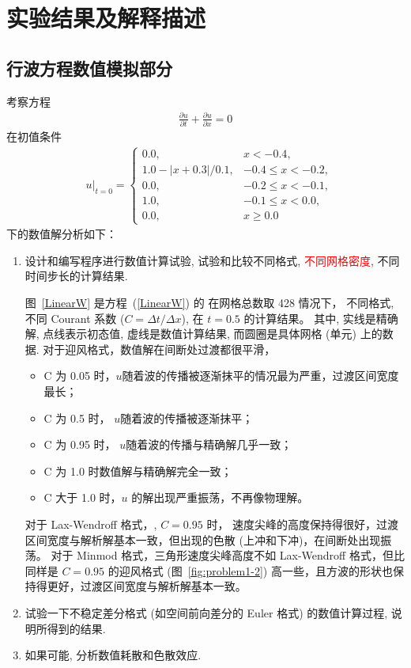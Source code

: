 \documentclass[10.5pt
]{article}
\begin{document}
\section{实验结果及解释描述}
\subsection{行波方程数值模拟部分}
考察方程
\begin{align}
\frac{\partial u}{\partial t} + \frac{\partial u}{\partial x} = 0
\end{align}
在初值条件
\begin{align}
& u|_{t=0} = \left\{\begin{array}{ll} 0.0, & x < -0.4, \\
1.0 - |x + 0.3| / 0.1, & -0.4 \le x < -0.2, \\
0.0, & -0.2 \le x < -0.1, \\
1.0 , & -0.1 \le x < 0.0, \\
0.0, & x \ge 0.0
\end{array}\right.
\end{align}
下的数值解分析如下：

\begin{enumerate}
\item
	设计和编写程序进行数值计算试验, 试验和比较不同格式, \textcolor{red}{不同网格密度}, 不同时间步长的计算结果.

图~\ref{LinearW} 是方程~(\ref{LinearW}) 的
在网格总数取 428 情况下，
不同格式, 不同 Courant 系数 ($C = \Delta t / \Delta x$), 在 $t = 0.5$ 的计算结果。
其中, 实线是精确解, 点线表示初态值, 虚线是数值计算结果, 而圆圈是具体网格 (单元) 上的数据. 
对于迎风格式，数值解在间断处过渡都很平滑，
\begin{itemize}
	\item C 为 0.05 时，$u$随着波的传播被逐渐抹平的情况最为严重，过渡区间宽度最长；
	\item C 为 0.5 时， $u$随着波的传播被逐渐抹平；
	\item C 为 0.95 时， $u$随着波的传播与精确解几乎一致；
	\item C 为 1.0 时数值解与精确解完全一致；
	\item C 大于 1.0 时，$u$ 的解出现严重振荡，不再像物理解。
\end{itemize}
对于 Lax-Wendroff 格式，, $C=0.95$ 时， 速度尖峰的高度保持得很好，过渡区间宽度与解析解基本一致，但出现的色散 (上冲和下冲)，在间断处出现振荡。
对于 Minmod 格式，三角形速度尖峰高度不如 Lax-Wendroff 格式，但比同样是 $C = 0.95$ 的迎风格式 (图~\ref{fig:problem1-2}) 高一些，且方波的形状也保持得更好，过渡区间宽度与解析解基本一致。

\item
 {\color{red} 试验一下不稳定差分格式 (如空间前向差分的 Euler 格式) 的数值计算过程, 说明所得到的结果.}
\item
  { \color{red} 如果可能, 分析数值耗散和色散效应.}
\end{enumerate}
\end{document}
